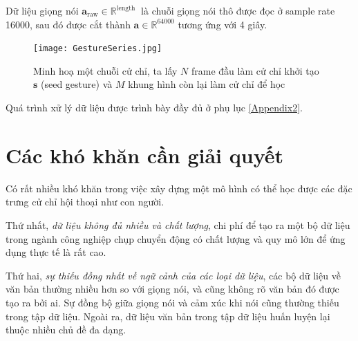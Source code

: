 Dữ liệu giọng nói $\mathbf{a}_{\text{raw}} \in \mathbb{R}^{ \text{length } }$ là chuỗi giọng nói thô được đọc ở sample rate 16000, sau đó được cắt thành $\mathbf{a} \in \mathbb{R}^{64000}$ tương ứng với 4 giây.
\begin{figure}[H]
	\centering
	\texttt{[image: GestureSeries.jpg]}
	\caption{Minh hoạ một chuỗi cử chỉ, ta lấy $N$ frame đầu làm cử chỉ khởi tạo $\mathbf{s}$ (seed gesture) và $M$ khung hình còn lại làm cử chỉ để học}
	\label{fig:GestureSeries}
\end{figure}


Quá trình xử lý dữ liệu được trình bày đầy đủ ở phụ lục \ref{Appendix2}.





\section{Các khó khăn cần giải quyết}

Có rất nhiều khó khăn trong việc xây dựng một mô hình có thể học được các đặc trưng cử chỉ hội thoại như con người.

Thứ nhất, \textit{dữ liệu không đủ nhiều và chất lượng}, chi phí để tạo ra một bộ dữ liệu trong ngành công nghiệp chụp chuyển động có chất lượng và quy mô lớn để ứng dụng thực tế là rất cao.

Thứ hai, \textit{sự thiếu đồng nhất về ngữ cảnh của các loại dữ liệu}, các bộ dữ liệu về văn bản thường nhiều hơn so với giọng nói, và cũng không rõ văn bản đó được tạo ra bởi ai. Sự đồng bộ giữa giọng nói và cảm xúc khi nói cũng thường thiếu trong tập dữ liệu. Ngoài ra, dữ liệu văn bản trong tập dữ liệu huấn luyện lại thuộc nhiều chủ đề đa dạng.
 
